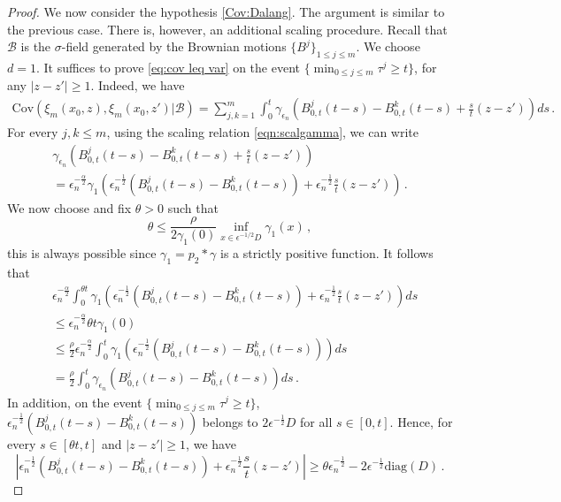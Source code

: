 \documentclass[12pt,reqno]{amsart}
\theoremstyle{remark}
\newcommand{\1}{\mathbf{1}}
\def\lt{\left}
\def\rt{\right}
\begin{document}
\begin{proof}
			We now consider the hypothesis \ref{Cov:Dalang}.
			The argument is similar to the previous case. There is, however, an additional scaling procedure. Recall that $\mathcal{B}$ is the $\sigma$-field generated by the Brownian motions $\{B^j\}_{1\leq j \leq m}$. We choose $d=1$. It suffices to prove \eqref{eq:cov leq var} on the event $\{ \min_{0\le j\le m} \tau^j\ge t \}$, for any $|z-z'|\ge1$.
			Indeed, we have
			\begin{align*}
				\text{Cov}\left( \xi_m(x_0,z), \xi_m(x_0,z')\Big| \mathcal B \right)
				=\sum_{j, k=1}^m \int_0^t  \gamma_{\epsilon_n} \left( B_{0,t}^j(t-s) -  B_{0,t}^k(t-s) + \frac{s}{t} (z-z')\right) ds\,.
			\end{align*}
			For every $j,k\le m$, using the scaling relation \eqref{eqn:scalgamma},
			we can write
			\begin{multline*}
				\gamma_{\epsilon_n}\left(B_{0,t}^j(t-s) - B_{0,t}^k(t-s)+ \frac{s}{t} (z-z')\right)
				\\=\epsilon_n^{-\frac \alpha2} \gamma_{1}\left(\epsilon_n^{-\frac12}(B_{0,t}^j(t-s) - B_{0,t}^k(t-s))+ \epsilon_n^{-\frac12}\frac{s}{t} (z-z')\right) \,.
			\end{multline*}
			We now choose and fix $\theta>0$ such that 
			\begin{equation}
			\theta   \leq\frac{\rho}{2\gamma_1(0)}\inf_{x\in \epsilon^{-1/2} D} \gamma_1(x)\,,
			\end{equation}
			this is always possible since $\gamma_1=p_{2}*\gamma$ is a strictly positive function.
			It follows that
			\begin{align*}
				&\epsilon_n^{-\frac \alpha2}\int_0^{\theta t} \gamma_{1}\left(\epsilon_n^{-\frac12}(B_{0,t}^j(t-s) - B_{0,t}^k(t-s))+ \epsilon_n^{-\frac12}\frac{s}{t} (z-z')\right)ds
				\\&\le\epsilon_n^{-\frac \alpha2} \theta t \gamma_1(0)
				\\&\le \frac \rho2\epsilon_n^{-\frac \alpha2}\int_0^t\gamma_{1}\left(\epsilon_n^{-\frac12}(B_{0,t}^j(t-s) - B_{0,t}^k(t-s))\right)ds 
				\\&= \frac \rho2\int_0^t\gamma_{\epsilon_n}\left(B_{0,t}^j(t-s) - B_{0,t}^k(t-s)\right)ds \,.
			\end{align*}
			In addition, on the event $\{\min_{0\le j\le m} \tau^j\ge t \}$, $\epsilon_n^{-\frac12}(B_{0,t}^j(t-s)-B_{0,t}^k(t-s))$ belongs to $2\epsilon^{-\frac12}D$ for all $s\in[0,t]$. Hence, for every $s\in[\theta t,t]$ and $|z-z'|\ge1$, we have
			\begin{equation*}
				\lt|\epsilon_n^{-\frac12}(B_{0,t}^j(t-s)-B_{0,t}^k(t-s))+ \epsilon_n^{-\frac12}\frac{s}{t} (z-z')\rt|\ge \theta  \epsilon_n^{-\frac12}- 2 \epsilon^{-\frac12} \mathrm{diag}(D)\,.

\end{equation*}
\end{proof}
\end{document}
